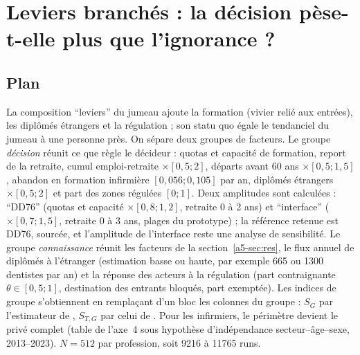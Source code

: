 \section{Leviers branchés : la décision pèse-t-elle plus que l'ignorance ?}\label{a5-sec:lev}
\subsection{Plan}
La composition \enquote{leviers} du jumeau ajoute la formation (vivier relié aux entrées), les diplômés étrangers et
la régulation ; son statu quo égale le tendanciel du jumeau à une personne près\mesure{}. On sépare deux groupes de
facteurs. Le groupe \emph{décision} réunit ce que règle le décideur : quotas et capacité de formation, report de la
retraite, cumul emploi-retraite $\times[0{,}5 ; 2]$, départs avant 60 ans $\times[0{,}5 ; 1{,}5]$, abandon en
formation infirmière $[0{,}056 ; 0{,}105]$ par an\derive{}, diplômés étrangers $\times[0{,}5 ; 2]$ et part des zones
régulées $[0 ; 1]$. Deux amplitudes sont calculées : \enquote{DD76} (quotas et capacité $\times[0{,}8 ; 1{,}2]$,
retraite 0 à 2 ans) et \enquote{interface} ($\times[0{,}7 ; 1{,}5]$, retraite 0 à 3 ans, plages du prototype) ; la
référence retenue est DD76, sourcée, et l'amplitude de l'interface reste une analyse de sensibilité. Le
groupe \emph{connaissance} réunit les facteurs de la section~\ref{a5-sec:res}, le flux annuel de diplômés à l'étranger
(estimation basse ou haute, par exemple 665 ou \num{1300} dentistes par an\derive{}) et la réponse des acteurs à la
régulation (part contraignante $\theta \in [0{,}5 ; 1]$\suppose{}, destination des entrants bloqués, part exemptée).
Les indices de groupe s'obtiennent en remplaçant d'un bloc les colonnes du groupe : $S_G$ par l'estimateur de
\citet{a5-saltelli2010}, $S_{T,G}$ par celui de \citet{a5-jansen1999}. Pour les infirmiers, le périmètre devient le privé
complet (table de l'axe~4 sous hypothèse d'indépendance secteur--âge--sexe, 2013--2023). $N = 512$ par profession,
soit \num{9216} à \num{11765}\mesure{} runs.

